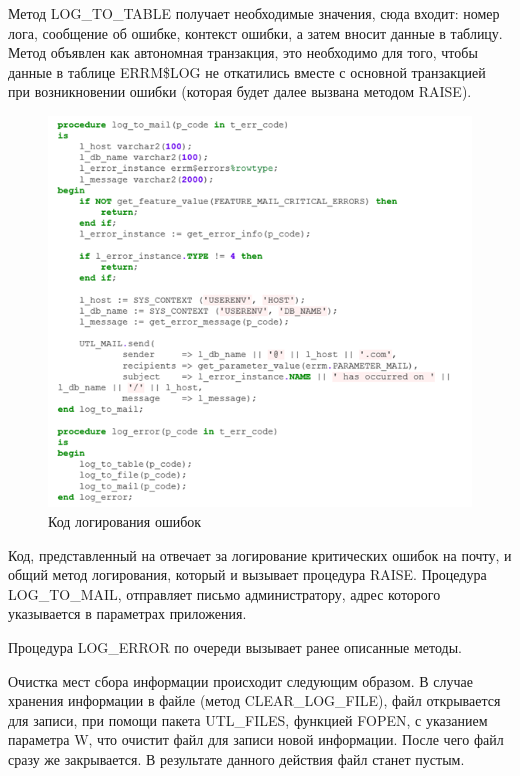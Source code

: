 Метод LOG\_TO\_TABLE получает необходимые значения, сюда входит: номер лога, сообщение об ошибке, контекст ошибки, а затем вносит данные в таблицу. Метод объявлен как автономная транзакция, это необходимо для того, чтобы данные в таблице ERRM\$LOG не откатились вместе с основной транзакцией при возникновении ошибки (которая будет далее вызвана методом RAISE).

\begin{figure}[ht!] 
	\center
	\includegraphics [scale=1] {my_folder/img/c3_log_code.png}
	\caption{Код логирования ошибок} 
	\label{fig:c3_log_code}  
\end{figure}
\FloatBarrier

Код, представленный на  отвечает за логирование критических ошибок на почту, и общий метод логирования, который и вызывает процедура RAISE. Процедура LOG\_TO\_MAIL, отправляет письмо администратору, адрес которого указывается в параметрах приложения. 

Процедура LOG\_ERROR по очереди вызывает ранее описанные методы. 

Очистка мест сбора информации происходит следующим образом. В случае хранения информации в файле (метод CLEAR\_LOG\_FILE), файл открывается для записи, при помощи пакета UTL\_FILES, функцией FOPEN, с указанием параметра W, что очистит файл для записи новой информации. После чего файл сразу же закрывается. В результате данного действия файл станет пустым. 

